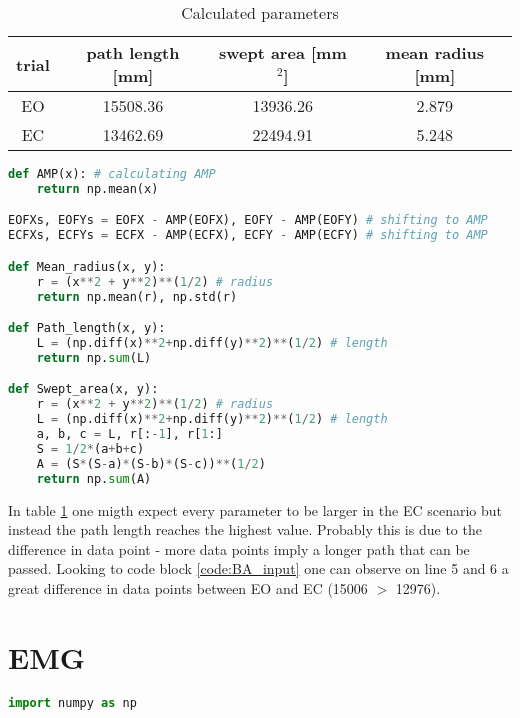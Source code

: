 \documentclass[english, a4paper, 11pt]{article}
\begin{document}
    \begin{table}[!h]
        \centering
        \begin{tabular}{c|c|c|c}
            trial & path length [mm] & swept area [mm$^2$] & mean radius [mm]\\ \hline
            EO & 15508.36 & 13936.26 & 2.879\\
            EC & 13462.69 & 22494.91 & 5.248
        \end{tabular}
        \caption{Calculated parameters}
        \label{tab:params}
    \end{table}

    \begin{lstlisting}[language=Python, caption=calculating the parameters]
def AMP(x): # calculating AMP
    return np.mean(x)

EOFXs, EOFYs = EOFX - AMP(EOFX), EOFY - AMP(EOFY) # shifting to AMP
ECFXs, ECFYs = ECFX - AMP(ECFX), ECFY - AMP(ECFY) # shifting to AMP

def Mean_radius(x, y):
    r = (x**2 + y**2)**(1/2) # radius
    return np.mean(r), np.std(r)

def Path_length(x, y):
    L = (np.diff(x)**2+np.diff(y)**2)**(1/2) # length
    return np.sum(L)

def Swept_area(x, y):
    r = (x**2 + y**2)**(1/2) # radius
    L = (np.diff(x)**2+np.diff(y)**2)**(1/2) # length
    a, b, c = L, r[:-1], r[1:]
    S = 1/2*(a+b+c)
    A = (S*(S-a)*(S-b)*(S-c))**(1/2)
    return np.sum(A)
    \end{lstlisting}

In table \ref*{tab:params} one migth expect every parameter to be larger in the EC scenario but instead the path length
reaches the highest value. Probably this is due to the difference in data point - more data points imply a longer path that can be passed.
Looking to code block \ref*{code:BA_input} one can observe on line 5 and 6 a great difference in data points between EO and EC (15006 $>$ 12976).



\section{EMG}

\begin{lstlisting}[language=Python, caption=Python example]
    import numpy as np

    
\end{lstlisting}
\end{document}
